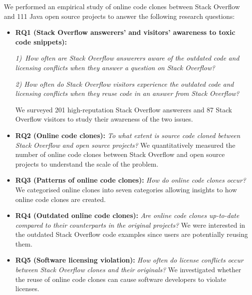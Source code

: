 \documentclass[10pt,journal,compsoc]{IEEEtran}
\begin{document}
We performed an empirical study of online code clones between Stack
Overflow and 111 Java open source projects to answer the following
research questions:
\begin{itemize}
	
	\item \textbf{RQ1 (Stack Overflow answerers' and visitors' awareness to toxic code snippets): }
	
	\textit{1)~How often are Stack Overflow
		answerers aware of the outdated code and licensing conflicts when
		they answer a question on Stack Overflow?} 
	
	\textit{2) How often do Stack Overflow
		visitors experience the outdated code and licensing conflicts when
		they reuse code in an answer from Stack Overflow?} 
	
	We surveyed 201 high-reputation Stack Overflow answerers and 87 Stack Overflow visitors to study their
	awareness of the two issues.

	\item \textbf{RQ2 (Online code clones): }\textit{To what extent is source
		code cloned between Stack Overflow and open source projects?} We
	quantitatively measured the number of online code clones between Stack
	Overflow and open source projects to understand the scale of the
	problem. 
	
	\item \textbf{RQ3 (Patterns of online code clones): }\textit{How do online
		code clones occur?} We categorised online clones into seven
	categories allowing insights to how online code clones are created.
	
	\item \textbf{RQ4 (Outdated online code clones): }\textit{Are
		online code clones up-to-date compared to their counterparts in the
		original projects?} We were interested in the outdated Stack
	Overflow code examples since users are potentially reusing
	them. 
	
	\item \textbf{RQ5 (Software licensing violation): }\textit{How often do
		license conflicts occur between Stack Overflow clones and their
		originals?} We investigated whether the reuse of online code clones
	can cause software developers to violate licenses.
\end{itemize}
\end{document}
